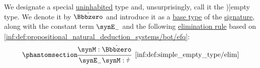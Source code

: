 \begin{definition}\label{def:simple_empty_type}\mimprovised
  We designate a special \hyperref[def:type_habitation]{uninhabited} type and, unsurprisingly, call it the \term[en=empty type (\cite[\S 4.3.4]{Mimram2020ProgramEqualsProof})]{empty type}. We denote it by \( \syn\Bbbzero \) and introduce it as a \hyperref[def:simple_type]{base type} of the \hyperref[def:simple_type_signature]{signature}, along with the constant term \( \synE_- \) and the following \hyperref[rem:type_theory_rule_classification/elim]{elimination rule} based on \ref{inf:def:propositional_natural_deduction_systems/bot/efq}:
  \begin{equation*}\taglabel[\ensuremath{ \Bbbzero_- }]{inf:def:simple_empty_type/elim}
    \begin{prooftree}
      \hypo{ \synM: \syn\Bbbzero }
      \infer1[\ref{inf:def:simple_empty_type/elim}]{ \synE_- \synM: \syn\tau }
    \end{prooftree}
  \end{equation*}
\end{definition}
